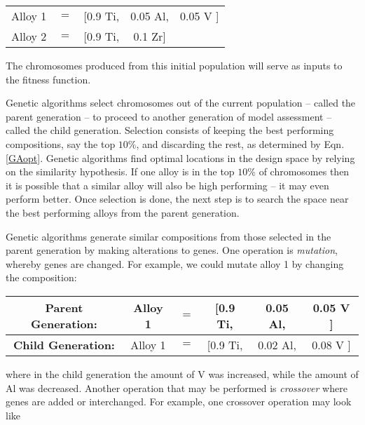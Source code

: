 \begin{table}[h!]
\begin{tabular}{ccccc}
	Alloy 1 & $=$ & [0.9 Ti, & 0.05 Al, & 0.05 V ] \\
	Alloy 2 & $=$ & [0.9 Ti, & 0.1 Zr] & \\
\end{tabular}
\end{table}
\noindent
The chromosomes produced from this initial population will serve as inputs to the fitness function. 

Genetic algorithms select chromosomes out of the current population -- called the parent generation --  to proceed to another generation of model assessment -- called the child generation. Selection consists of keeping the best performing compositions, say the top $10\%$, and discarding the rest, as determined by Eqn. \ref{GAopt}. Genetic algorithms find optimal locations in the design space by relying on the similarity hypothesis. If one alloy is in the top $10\%$ of chromosomes then it is possible that a similar alloy will also be high performing -- it may even perform better. Once selection is done, the next step is to search the space near the best performing alloys from the parent generation.

Genetic algorithms generate similar compositions from those selected in the parent generation by making alterations to genes. One operation is \textit{mutation}, whereby genes are changed. For example, we could mutate alloy 1 by changing the composition:\\

\begin{table}[h!]
\begin{center}
\begin{tabular}{c|ccccc}
	\textbf{Parent Generation:} & Alloy 1 & $=$ & [0.9 Ti, & {\color{red}0.05} Al, & {\color{red}0.05} V ] \\ \hline
	\textbf{Child Generation:} & Alloy 1 & $=$ & [0.9 Ti, & {\color{blue}0.02} Al, & {\color{blue}0.08} V  ]  \\ 
\end{tabular}
\end{center}
\end{table}
\noindent where in the child generation the amount of V was increased, while the amount of Al was decreased. Another operation that may be performed is \textit{crossover} where genes are added or interchanged. For example, one crossover operation may look like

